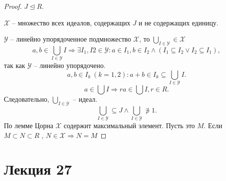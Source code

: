 \documentclass[12pt]{report}
\begin{document}
\begin{proof}
    $ J \trianglelefteq R$. %

    $ \mathcal{X}$ -- множество всех идеалов, содержащих $ J$ и не содержащих единицу.

    $\mathcal{Y}$ -- линейно упорядоченное подмножество $ \mathcal{X}$, то $ \bigcup_{I \in \mathcal{Y}} \in \mathcal{X}$
    \[
	a, b \in  \bigcup_{I \in \mathcal{Y}} I \Longrightarrow \exists I_1, I 2 \in \mathcal{Y}: a \in  I_1, b \in I_2 \wedge (I_1 \subseteq I_2 \vee I_2 \subseteq I_1) 
    ,\] 
    так как $\mathcal{Y}$ -- линейно упорядочено.
    \[
	a, b \in  I_k ~(k = 1, 2): a+b \in  I_k \subseteq \bigcup_{I \in \mathcal{Y}}  I
    .\] 
    \[
    a \in  \bigcup I \Longrightarrow ra \in  \bigcup I, r \in  R
    .\] 
    Следовательно, $ \bigcup_{I \in \mathcal{Y}}  $ -- идеал.
    \[
    \bigcup_{I \in\mathcal{Y}} \subseteq J \wedge \bigcup_{ I \in \mathcal{Y}} \not\ni 1 
    .\] 
    По лемме Цорна $ \mathcal{X}$ содержит максимальный элемент. Пусть это $ M$.
    Если $ M \subset N \subset R$ %
    , $ N \in  \mathcal{X} \Rightarrow  N = M$
\end{proof}
\section{Лекция 27}
\end{document}
